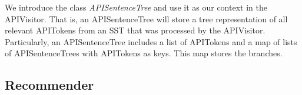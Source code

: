 We introduce the class \textit{APISentenceTree} and use it as our context in the APIVisitor. That is, an APISentenceTree will store a tree representation of all relevant APITokens from an SST that was processed by the APIVisitor.
Particularly, an APISentenceTree includes a list of APITokens and a map of lists of APISentenceTrees with APITokens as keys. This map stores the branches.


\subsection{Recommender}
